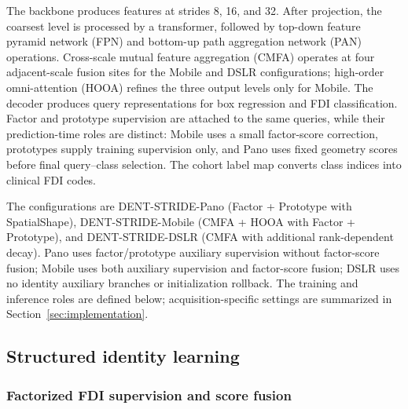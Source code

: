 \documentclass[a4paper,fleqn]{cas-dc}
\begin{document}
The backbone produces features at strides 8, 16, and 32. After projection, the coarsest level is processed by a transformer, followed by top-down feature pyramid network (FPN) and bottom-up path aggregation network (PAN) operations. Cross-scale mutual feature aggregation (CMFA) operates at four adjacent-scale fusion sites for the Mobile and DSLR configurations; high-order omni-attention (HOOA) refines the three output levels only for Mobile. The decoder produces query representations for box regression and FDI classification. Factor and prototype supervision are attached to the same queries, while their prediction-time roles are distinct: Mobile uses a small factor-score correction, prototypes supply training supervision only, and Pano uses fixed geometry scores before final query--class selection. The cohort label map converts class indices into clinical FDI codes.

The configurations are DENT-STRIDE-Pano (Factor + Prototype with SpatialShape), DENT-STRIDE-Mobile (CMFA + HOOA with Factor + Prototype), and DENT-STRIDE-DSLR (CMFA with additional rank-dependent decay). Pano uses factor/prototype auxiliary supervision without factor-score fusion; Mobile uses both auxiliary supervision and factor-score fusion; DSLR uses no identity auxiliary branches or initialization rollback. The training and inference roles are defined below; acquisition-specific settings are summarized in Section~\ref{sec:implementation}.

\subsection{Structured identity learning}
\label{sec:identity}

\subsubsection{Factorized FDI supervision and score fusion}
\label{sec:factors}
\end{document}
